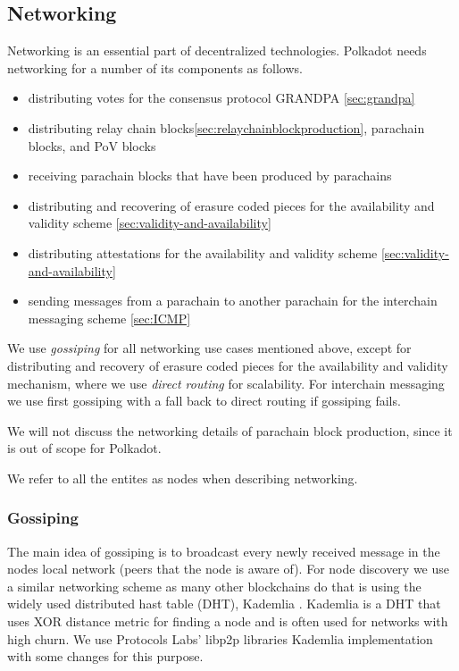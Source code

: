 \subsection{Networking}\label{sec:networking}

Networking is an essential part of decentralized technologies.
Polkadot needs networking for a number of its components as follows.
\begin{itemize}
\item distributing votes for the consensus protocol GRANDPA \ref{sec:grandpa}
\item distributing relay chain blocks\ref{sec:relaychainblockproduction}, parachain blocks, and PoV blocks
\item receiving parachain blocks that have been produced by parachains
\item distributing and recovering of erasure coded pieces for the availability and validity scheme \ref{sec:validity-and-availability}
\item distributing attestations for the availability and validity scheme \ref{sec:validity-and-availability}
\item sending messages from a parachain to another parachain for the interchain messaging scheme \ref{sec:ICMP}
\end{itemize}

We use \emph{gossiping} for all networking use cases mentioned above, except for distributing and recovery of erasure coded pieces for the availability and validity mechanism, where we use \emph{direct routing} for scalability.
For interchain messaging we use first gossiping with a fall back to direct routing if gossiping fails.

We will not discuss the networking details of parachain block production, since it is out of scope for Polkadot.

We refer to all the entites as nodes when describing networking.


\subsubsection{Gossiping}
The main idea of gossiping is to broadcast every newly received message in the nodes local network (peers that the node is aware of).
For node discovery we use a similar networking scheme as many other blockchains do that is using the widely used distributed hast table (DHT), Kademlia \cite{Maymounkov:2002:Kademila}.
Kademlia is a DHT that uses XOR distance metric for finding a node and is often used for networks with high churn.
We use Protocols Labs' libp2p libraries \cite{} Kademlia implementation with some changes for this purpose.

